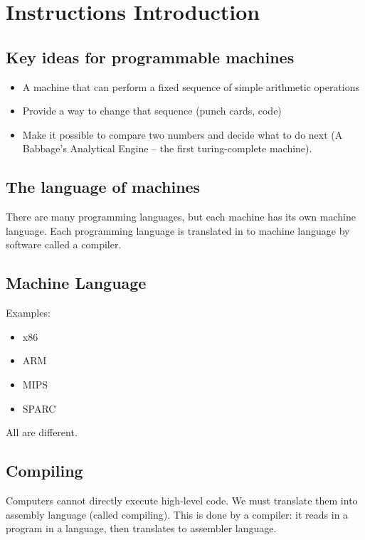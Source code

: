 \section{Instructions Introduction}\label{sec:instructions_introduction}

\subsection{Key ideas for programmable machines}\label{sub:key_ideas_for_programmable_machines}

\begin{itemize}
    \item   A machine that can perform a fixed sequence of simple arithmetic operations
    \item Provide a way to change that sequence (punch cards, code)
    \item Make it possible to compare two numbers and decide what to do next (A Babbage's Analytical Engine -- the first turing-complete machine).
\end{itemize}

\subsection{The language of machines}\label{sub:the_language_of_machines}

There are many programming languages, but each machine has its own machine language.
Each programming language is translated in to machine language by software called a compiler.

\subsection{Machine Language}\label{sub:machine_language}

Examples:
\begin{itemize}
    \item x86
    \item ARM
    \item MIPS
    \item SPARC
\end{itemize}
All are different.

\subsection{Compiling}\label{sub:compiling}

Computers cannot directly execute high-level code.
We must translate them into assembly language (called compiling).
This is done by a compiler: it reads in a program in a language, then translates to assembler language.


